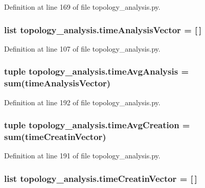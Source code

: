 Definition at line 169 of file topology\-\_\-analysis.\-py.

\hypertarget{a00157_a3ddbda333425be797470f7d058e2c8a4}{
\subsubsection[{time\-Analysis\-Vector}]{\setlength{\rightskip}{0pt plus 5cm}list topology\-\_\-analysis.\-time\-Analysis\-Vector = \mbox{[}$\,$\mbox{]}}}\label{a00157_a3ddbda333425be797470f7d058e2c8a4}


Definition at line 107 of file topology\-\_\-analysis.\-py.

\hypertarget{a00157_a0689e49982e7bedba8ac4eb5534963db}{
\subsubsection[{time\-Avg\-Analysis}]{\setlength{\rightskip}{0pt plus 5cm}tuple topology\-\_\-analysis.\-time\-Avg\-Analysis = {\bf sum}({\bf time\-Analysis\-Vector})}}\label{a00157_a0689e49982e7bedba8ac4eb5534963db}


Definition at line 192 of file topology\-\_\-analysis.\-py.

\hypertarget{a00157_a4cd61f10a5a0a8d80608e71a1fc2009c}{
\subsubsection[{time\-Avg\-Creation}]{\setlength{\rightskip}{0pt plus 5cm}tuple topology\-\_\-analysis.\-time\-Avg\-Creation = {\bf sum}({\bf time\-Creatin\-Vector})}}\label{a00157_a4cd61f10a5a0a8d80608e71a1fc2009c}


Definition at line 191 of file topology\-\_\-analysis.\-py.

\hypertarget{a00157_a0527a0989312340a402661aebc675d30}{
\subsubsection[{time\-Creatin\-Vector}]{\setlength{\rightskip}{0pt plus 5cm}list topology\-\_\-analysis.\-time\-Creatin\-Vector = \mbox{[}$\,$\mbox{]}}}\label{a00157_a0527a0989312340a402661aebc675d30}


